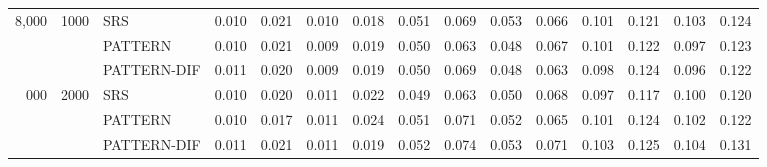 {\begin{tabular}{rrl rr rr rr rr rr rr }
8{,}000 & 1000 & SRS & 0.010 & 0.021 & 0.010 & 0.018 & 0.051 & 0.069 & 0.053 & 0.066 & 0.101 & 0.121 & 0.103 & 0.124 \\
 &  & PATTERN & 0.010 & 0.021 & 0.009 & 0.019 & 0.050 & 0.063 & 0.048 & 0.067 & 0.101 & 0.122 & 0.097 & 0.123 \\
 &  & PATTERN-DIF & 0.011 & 0.020 & 0.009 & 0.019 & 0.050 & 0.069 & 0.048 & 0.063 & 0.098 & 0.124 & 0.096 & 0.122 \\
\addlinespace
8{,}000 & 2000 & SRS & 0.010 & 0.020 & 0.011 & 0.022 & 0.049 & 0.063 & 0.050 & 0.068 & 0.097 & 0.117 & 0.100 & 0.120 \\
 &  & PATTERN & 0.010 & 0.017 & 0.011 & 0.024 & 0.051 & 0.071 & 0.052 & 0.065 & 0.101 & 0.124 & 0.102 & 0.122 \\
 &  & PATTERN-DIF & 0.011 & 0.021 & 0.011 & 0.019 & 0.052 & 0.074 & 0.053 & 0.071 & 0.103 & 0.125 & 0.104 & 0.131 \\
\bottomrule\end{tabular}}
